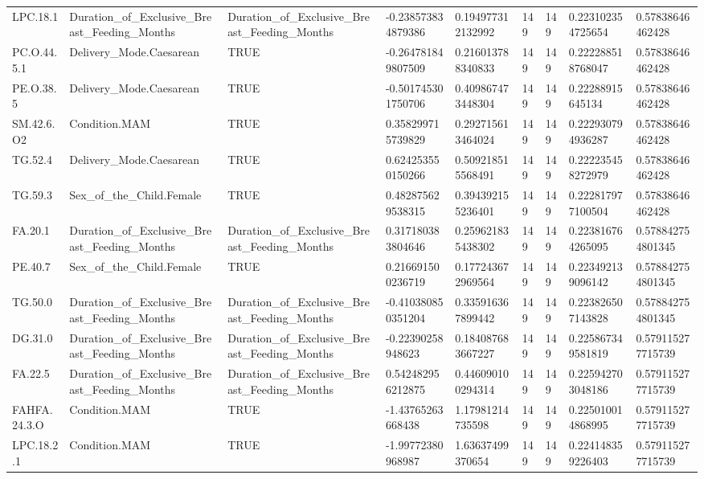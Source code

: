 \begin{longtable}{lllllllll}
LPC.18.1 & Duration\_of\_Exclusive\_Breast\_Feeding\_Months & Duration\_of\_Exclusive\_Breast\_Feeding\_Months & -0.238573834879386 & 0.194977312132992 & 149 & 149 & 0.223102354725654 & 0.57838646462428 \\
PC.O.44.5.1 & Delivery\_Mode.Caesarean & TRUE & -0.264781849807509 & 0.216013788340833 & 149 & 149 & 0.222288518768047 & 0.57838646462428 \\
PE.O.38.5 & Delivery\_Mode.Caesarean & TRUE & -0.501745301750706 & 0.409867473448304 & 149 & 149 & 0.22288915645134 & 0.57838646462428 \\
SM.42.6.O2 & Condition.MAM & TRUE & 0.358299715739829 & 0.292715613464024 & 149 & 149 & 0.222930794936287 & 0.57838646462428 \\
TG.52.4 & Delivery\_Mode.Caesarean & TRUE & 0.624253550150266 & 0.509218515568491 & 149 & 149 & 0.222235458272979 & 0.57838646462428 \\
TG.59.3 & Sex\_of\_the\_Child.Female & TRUE & 0.482875629538315 & 0.394392155236401 & 149 & 149 & 0.222817977100504 & 0.57838646462428 \\
FA.20.1 & Duration\_of\_Exclusive\_Breast\_Feeding\_Months & Duration\_of\_Exclusive\_Breast\_Feeding\_Months & 0.317180383804646 & 0.259621835438302 & 149 & 149 & 0.223816764265095 & 0.578842754801345 \\
PE.40.7 & Sex\_of\_the\_Child.Female & TRUE & 0.216691500236719 & 0.177243672969564 & 149 & 149 & 0.223492139096142 & 0.578842754801345 \\
TG.50.0 & Duration\_of\_Exclusive\_Breast\_Feeding\_Months & Duration\_of\_Exclusive\_Breast\_Feeding\_Months & -0.410380850351204 & 0.335916367899442 & 149 & 149 & 0.223826507143828 & 0.578842754801345 \\
DG.31.0 & Duration\_of\_Exclusive\_Breast\_Feeding\_Months & Duration\_of\_Exclusive\_Breast\_Feeding\_Months & -0.22390258948623 & 0.184087683667227 & 149 & 149 & 0.225867349581819 & 0.579115277715739 \\
FA.22.5 & Duration\_of\_Exclusive\_Breast\_Feeding\_Months & Duration\_of\_Exclusive\_Breast\_Feeding\_Months & 0.542482956212875 & 0.446090100294314 & 149 & 149 & 0.225942703048186 & 0.579115277715739 \\
FAHFA.24.3.O & Condition.MAM & TRUE & -1.43765263668438 & 1.17981214735598 & 149 & 149 & 0.225010014868995 & 0.579115277715739 \\
LPC.18.2.1 & Condition.MAM & TRUE & -1.99772380968987 & 1.63637499370654 & 149 & 149 & 0.224148359226403 & 0.579115277715739 \\

\end{longtable}
